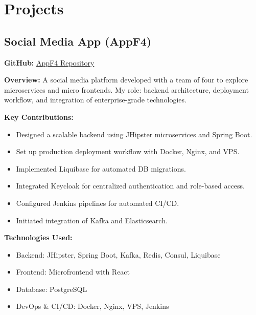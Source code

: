 \documentclass[11pt,a4paper]{article}
\begin{document}
\section{Projects}
\begin{adjustwidth}{2em}{}
\begin{multicols}{2}

\subsection{Social Media App (AppF4)}

\textbf{GitHub:} \href{https://github.com/shegga9x/appf4}{AppF4 Repository}


\textbf{Overview:} A social media platform developed with a team of four to explore microservices and micro frontends. My role: backend architecture, deployment workflow, and integration of enterprise-grade technologies.

\textbf{Key Contributions:}
\begin{itemize}[leftmargin=*]
    \item Designed a scalable backend using JHipster microservices and Spring Boot.
    \item Set up production deployment workflow with Docker, Nginx, and VPS.
    \item Implemented Liquibase for automated DB migrations.
    \item Integrated Keycloak for centralized authentication and role-based access.
    \item Configured Jenkins pipelines for automated CI/CD.
    \item Initiated integration of Kafka and Elasticsearch.
\end{itemize}

\textbf{Technologies Used:}
\begin{itemize}[leftmargin=*]
    \item Backend: JHipster, Spring Boot, Kafka, Redis, Consul, Liquibase
    \item Frontend: Microfrontend with React
    \item Database: PostgreSQL
    \item DevOps \& CI/CD: Docker, Nginx, VPS, Jenkins
\end{itemize}


\end{multicols}
\end{adjustwidth}
\end{document}
